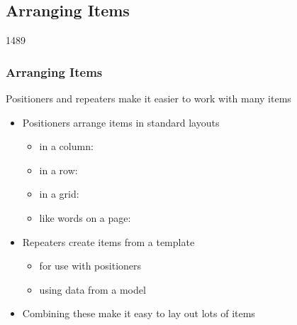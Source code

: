 %
%
%
%

\subsection{Arranging Items}


\begin{slide}{1489}\frametitle{Arranging Items}

Positioners and repeaters make it easier to work with many items

\begin{itemize}
\item Positioners arrange items in standard layouts
  \begin{itemize}
  \item in a column: 
  \item in a row: 
  \item in a grid: 
  \item like words on a page: 
  \end{itemize}
\item Repeaters create items from a template
  \begin{itemize}
  \item for use with positioners
  \item using data from a model
  \end{itemize}
\item Combining these make it easy to lay out lots of items
\end{itemize}

\end{slide}


